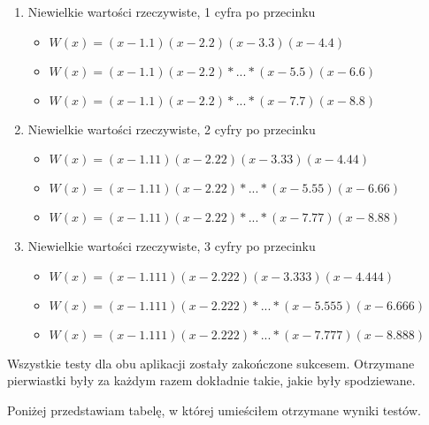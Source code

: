 \documentclass[oneside,a4paper]{book}
\begin{document}
	\begin{enumerate}
		\item Niewielkie wartości rzeczywiste, 1 cyfra po przecinku
		\begin{itemize}
			\item $W(x)=(x-1.1)(x-2.2)(x-3.3)(x-4.4)$
			\item $W(x)=(x-1.1)(x-2.2)*...*(x-5.5)(x-6.6)$
			\item $W(x)=(x-1.1)(x-2.2)*...*(x-7.7)(x-8.8)$
		\end{itemize}
		\item Niewielkie wartości rzeczywiste, 2 cyfry po przecinku
		\begin{itemize}
			\item $W(x)=(x-1.11)(x-2.22)(x-3.33)(x-4.44)$
			\item $W(x)=(x-1.11)(x-2.22)*...*(x-5.55)(x-6.66)$
			\item $W(x)=(x-1.11)(x-2.22)*...*(x-7.77)(x-8.88)$
		\end{itemize}
		\item Niewielkie wartości rzeczywiste, 3 cyfry po przecinku
		\begin{itemize}
			\item $W(x)=(x-1.111)(x-2.222)(x-3.333)(x-4.444)$
			\item $W(x)=(x-1.111)(x-2.222)*...*(x-5.555)(x-6.666)$
			\item $W(x)=(x-1.111)(x-2.222)*...*(x-7.777)(x-8.888)$
		\end{itemize}
	\end{enumerate}
	
	Wszystkie testy dla obu aplikacji zostały zakończone sukcesem. Otrzymane pierwiastki były za każdym razem dokładnie takie, jakie były spodziewane.
	
	Poniżej przedstawiam tabelę, w której umieściłem otrzymane wyniki testów.
	
\end{document}

